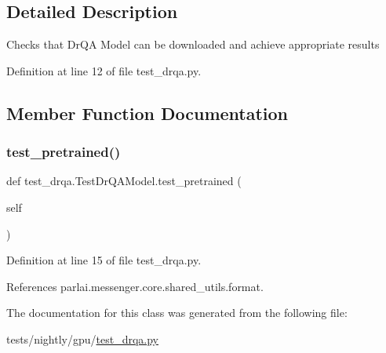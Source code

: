 \subsection{Detailed Description}
\begin{DoxyVerb}Checks that DrQA Model can be downloaded and achieve appropriate results\end{DoxyVerb}
 

Definition at line 12 of file test\+\_\+drqa.\+py.



\subsection{Member Function Documentation}
\mbox{\label{classtest__drqa_1_1TestDrQAModel_a7d1c0902015b2a1fb0d208e89c7adb93}} 
\subsubsection{\texorpdfstring{test\+\_\+pretrained()}{test\_pretrained()}}
{\footnotesize\ttfamily def test\+\_\+drqa.\+Test\+Dr\+Q\+A\+Model.\+test\+\_\+pretrained (\begin{DoxyParamCaption}\item[{}]{self }\end{DoxyParamCaption})}



Definition at line 15 of file test\+\_\+drqa.\+py.



References parlai.\+messenger.\+core.\+shared\+\_\+utils.\+format.



The documentation for this class was generated from the following file\+:\begin{DoxyCompactItemize}
\item 
tests/nightly/gpu/\hyperlink{test__drqa_8py}{test\+\_\+drqa.\+py}\end{DoxyCompactItemize}
